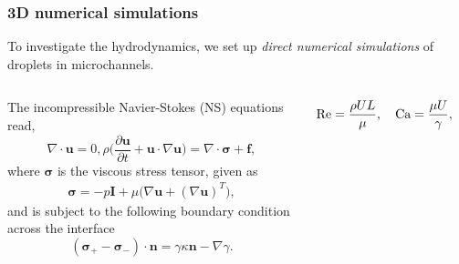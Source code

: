 \begin{frame}
  \frametitle{3D numerical simulations}

  To investigate the hydrodynamics, we set up {\it direct numerical simulations} of droplets in microchannels.
  \vskip0.3cm

  \pause
  \begin{columns}[T]

    \begin{column}{0.55\textwidth}
      \begin{bluecolorbox}
        The incompressible Navier-Stokes (NS) equations read,
        \begin{subequations} \label{eq:Navier-Sotkes}
          \begin{equation}
            \nabla \cdot {\bm u} = 0,
            \label{eq:div-free}
          \end{equation}
          \begin{equation}
            \rho \bigg(\frac{\partial {\bm u}}{\partial t} + {\bm u} \cdot \nabla {\bm u} \bigg) = \nabla \cdot {\bm \sigma} + {\bm f},
            \label{eq:NS}
          \end{equation}
        \end{subequations}
        where $\bm \sigma$ is the viscous stress tensor, given as
        \begin{equation}
          \begin{aligned}
            {\bm \sigma} = -p {\bm I}+ \mu \bigg( \nabla {\bm u} + (\nabla {\bm u})^T \bigg),
          \end{aligned}
        \end{equation}
        and is subject to the following boundary condition across the interface
        \begin{equation} \label{eq:stress-bc}
          ({\bm \sigma}_+ - {\bm \sigma}_- ) \cdot {\bm n} = \gamma \kappa {\bm n} - \nabla \gamma.
        \end{equation}
      \end{bluecolorbox}
    \end{column}

    \pause
    \begin{column}{0.4\textwidth}
      \centering
      \begin{bluecolorbox}
        \begin{equation} \notag
          \begin{aligned}
            \textrm{Re} = \frac{\rho UL}{\mu}, \quad
            \textrm{Ca} = \frac{\mu U}{\gamma}, \quad
            \textrm{Fr} = \frac{U^2}{FL}.  
          \end{aligned} \medskip
        \end{equation}
      \end{bluecolorbox}
      \vskip0.2cm


\end{column}
\end{columns}
\end{frame}
